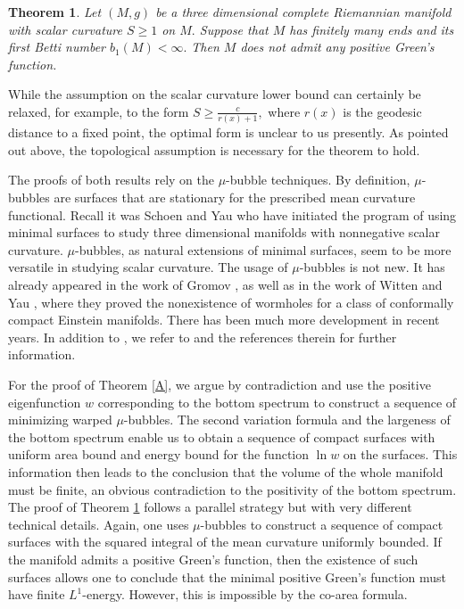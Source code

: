 \documentclass{amsart}
\newtheorem{theorem}{Theorem}[section]
\numberwithin{equation}{section}
\begin{document}
\begin{theorem}
\label{B} Let $\left( M,g\right) $ be a three dimensional complete
Riemannian manifold with scalar curvature $S\geq 1$ on $M.$ 
Suppose that $M$ has finitely many ends and its
first Betti number $b_{1}(M)<\infty.$ Then $M$ does not admit any positive Green's function.
\end{theorem}

While the assumption on the scalar curvature lower bound can certainly be relaxed, for example, to the form $S\geq \frac{c}{r(x)+1},$
where $r(x)$ is the geodesic distance to a fixed point, the optimal form is unclear to us presently. As pointed out above, the topological assumption is
necessary for the theorem to hold.

The proofs of both results rely on the $\mu$-bubble techniques. By definition, $\mu$-bubbles are surfaces that are stationary
for the prescribed mean curvature functional. Recall it was Schoen and Yau \cite{SY} who have initiated the program of using 
minimal surfaces to study three dimensional manifolds with nonnegative scalar curvature. $\mu$-bubbles, as natural extensions of minimal surfaces,
seem to be more versatile in studying scalar curvature. The usage of $\mu$-bubbles is not new. It has already appeared in the work of Gromov \cite{G1},
as well as in the work of Witten and Yau \cite{WY}, where they proved the nonexistence of wormholes for a class of conformally compact
Einstein manifolds. There has been much more development in recent years. In addition to \cite{G}, we refer to \cite{Z, CL, CLS, APX, HKKZ} 
and the references therein for further information.

For the proof of Theorem \ref{A}, we argue by contradiction and use the positive eigenfunction $w$ corresponding to the bottom spectrum
to construct a sequence of minimizing warped $\mu$-bubbles. The second variation formula and the largeness of the bottom spectrum enable
us to obtain a sequence of compact surfaces with uniform area bound and energy bound for the function $\ln w$ on the surfaces. This information
then leads to the conclusion that the volume of the whole manifold must be finite, an obvious contradiction to the positivity of the bottom spectrum.
The proof of Theorem \ref{B} follows a parallel strategy but with very different technical details. Again, one uses $\mu$-bubbles to construct a sequence
of compact surfaces with the squared integral of the mean curvature uniformly bounded. If the manifold admits a positive Green's function, then 
the existence of such surfaces allows one to conclude that the minimal positive Green's function must have finite $L^1$-energy. 
However, this is impossible by the co-area formula.
\end{document}
